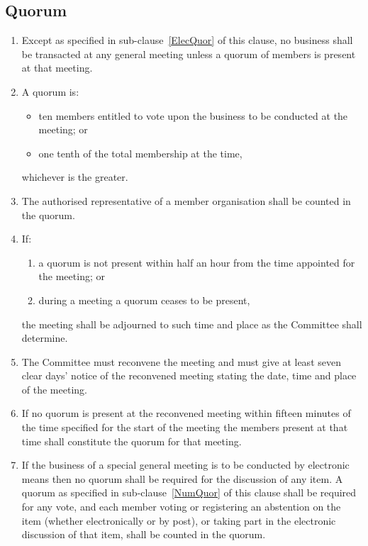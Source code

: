 \documentclass[a4paper,11pt]{article}
\begin{document}
\subsection{Quorum}

\begin{enumerate}
\item Except as specified in sub-clause~\ref{ElecQuor} of this clause, no business 
  shall be transacted at any general meeting unless a quorum of members is present
  at that meeting.
\item \label{NumQuor} A quorum is:
  \begin{itemize}
    \item ten members entitled to vote upon the business to
      be conducted at the meeting; or
    \item one tenth of the total membership at the time,
  \end{itemize}
  whichever is the greater.
\item The authorised representative of a member organisation shall be counted in
  the quorum.
\item If:
  \begin{enumerate}
    \item a quorum is not present within half an hour from the time appointed for
      the meeting; or
    \item during a meeting a quorum ceases to be present,
  \end{enumerate}
  the meeting shall be adjourned to such time and place as the Committee shall
  determine.
\item The Committee must reconvene the meeting and must give at least seven
  clear days' notice of the reconvened meeting stating the date, time and place
  of the meeting.
\item If no quorum is present at the reconvened meeting within fifteen minutes
  of the time specified for the start of the meeting the members present at that
  time shall constitute the quorum for that meeting.
\item \label{ElecQuor} If the business of a special general meeting is to be conducted 
  by electronic means
  then no quorum shall be required for the discussion of any item. A quorum as specified
  in sub-clause~\ref{NumQuor} of this clause shall be required for any vote, and each 
  member voting or registering an abstention on the item (whether electronically or by post),
  or taking part in the electronic discussion of that item, shall be counted in the quorum.
\end{enumerate}
\end{document}
